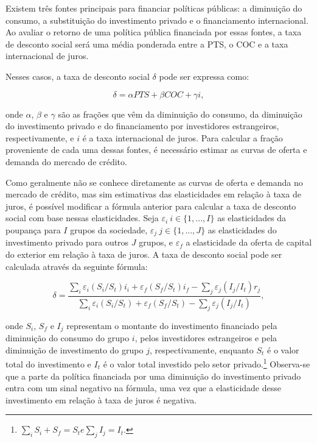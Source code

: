\documentclass[12pt,letterpaper]{article}
\newcommand{\1}{\mathbbm{1}}
\numberwithin{equation}{section}
\begin{document}
Existem três fontes principais para financiar políticas públicas: a diminuição do consumo, a substituição do investimento privado e o financiamento internacional. Ao avaliar o retorno de uma política pública financiada por essas fontes, a taxa de desconto social será uma média ponderada entre a PTS, o COC e a taxa internacional de juros.

Nesses casos, a taxa de desconto social $\delta$ pode ser expressa como:

\begin{equation}
    \delta = \alpha PTS + \beta COC + \gamma i,
\end{equation}

\noindent onde $\alpha$, $\beta$ e $\gamma$ são as frações que vêm da diminuição do consumo, da diminuição do investimento privado e do financiamento por investidores estrangeiros, respectivamente, e $i$ é a taxa internacional de juros. Para calcular a fração proveniente de cada uma dessas fontes, é necessário estimar as curvas de oferta e demanda do mercado de crédito.

Como geralmente não se conhece diretamente as curvas de oferta e demanda no mercado de crédito, mas sim estimativas das elasticidades em relação à taxa de juros, é possível modificar a fórmula anterior para calcular a taxa de desconto social com base nessas elasticidades. Seja $\varepsilon_{i}\ i\in\{1,...,I\}$ as elasticidades da poupança para $I$ grupos da sociedade, $\varepsilon_{j}\ j\in\{1,...,J\}$ as elasticidades do investimento privado para outros $J$ grupos, e $\varepsilon_{f}$ a elasticidade da oferta de capital do exterior em relação à taxa de juros. A taxa de desconto social pode ser calculada através da seguinte fórmula:

\begin{equation}
    \delta = \frac{\sum_{i}\varepsilon_{i}\left(S_{i}/S_{t}\right)i_{i}+\varepsilon_{f}\left(S_{f}/S_{t}\right)i_{f}-\sum_{j}\varepsilon_{j}\left(I_{j}/I_{t}\right)r_{j}}{\sum_{i}\varepsilon_{i}\left(S_{i}/S_{t}\right)+\varepsilon_{f}\left(S_{f}/S_{t}\right)-\sum_{j}\varepsilon_{j}\left(I_{j}/I_{t}\right)},
\end{equation}

\noindent onde $S_{i}$, $S_{f}$ e $I_{j}$ representam o montante do investimento financiado pela diminuição do consumo do grupo $i$, pelos investidores estrangeiros e pela diminuição de investimento do grupo $j$, respectivamente, enquanto $S_{t}$ é o valor total do investimento e $I_{t}$ é o valor total investido pelo setor privado.\footnote{$\sum_{i}S_{i} + S_{f} = S_{t} e \sum_{j}I_{j} = I_{t}$.} Observa-se que a parte da política financiada por uma diminuição do investimento privado entra com um sinal negativo na fórmula, uma vez que a elasticidade desse investimento em relação à taxa de juros é negativa.
\end{document}
